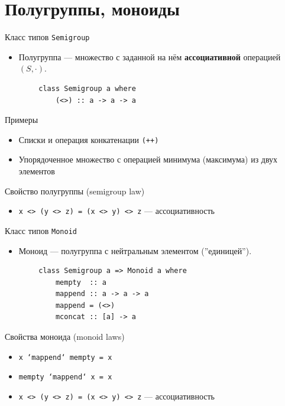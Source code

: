 \documentclass{beamer}
\begin{document}
  \section{Полугруппы, моноиды}
  \begin{frame}[fragile]{Класс типов \texttt{Semigroup}}
      \begin{itemize}
          \item Полугруппа --- множество с заданной на нём \textbf{ассоциативной} операцией $(S,\cdot)$.
      \end{itemize}
      \begin{verbatim}
        class Semigroup a where
            (<>) :: a -> a -> a
      \end{verbatim}
      
      \begin{block}{Примеры}
        \begin{itemize}
            \item Списки и операция конкатенации \texttt{(++)}
            \item Упорядоченное множество с операцией минимума (максимума) из двух элементов
        \end{itemize}
      \end{block}
      \begin{block}{Свойство полугруппы (semigroup law)}
        \begin{itemize}
            \item \texttt{x <> (y <> z) = (x <> y) <> z} --- ассоциативность
        \end{itemize}
      \end{block}
  \end{frame}
  \begin{frame}[fragile]{Класс типов \texttt{Monoid}}
      \begin{itemize}
          \item Моноид --- полугруппа с нейтральным элементом (''единицей'').
      \end{itemize}
      \begin{verbatim}
        class Semigroup a => Monoid a where
            mempty  :: a
            mappend :: a -> a -> a
            mappend = (<>)
            mconcat :: [a] -> a
      \end{verbatim}
      \begin{block}{Свойства моноида (monoid laws)}
        \begin{itemize}
            \item \texttt{x `mappend` mempty = x} 
            \item \texttt{mempty `mappend` x = x}
            \item \texttt{x <> (y <> z) = (x <> y) <> z} --- ассоциативность
        \end{itemize}
      \end{block}
  \end{frame}
\end{document}

